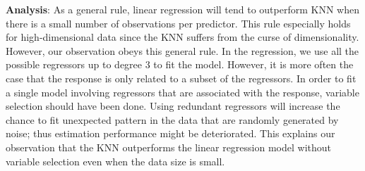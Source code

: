 \documentclass[]{article}
\begin{document}
\textbf{Analysis}:  As a general rule, linear regression will tend to outperform KNN when there is a small number of observations per predictor. This rule especially holds for high-dimensional data since the KNN suffers from the curse of dimensionality. However, our observation obeys this general rule. In the regression, we use all the possible regressors up to degree 3 to fit the model. However, it is more often the case that the response is only related to a subset of the regressors. In order to fit a single model involving regressors that are associated with the response, variable selection should have been done. Using redundant regressors will increase the chance to fit unexpected pattern in the data that are randomly generated by noise; thus estimation performance might be deteriorated. This explains our observation that the KNN outperforms the linear regression model without variable selection  even when the data size is small. 
\end{document}
